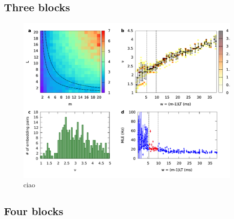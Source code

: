 \documentclass[a4paper,11pt,aps,secnumarabic,balancelastpage,amsmath,amssymb,floatfix,table]{article}
\begin{document}
\subsection{Three blocks}

\begin{figure}[H]
    \centering
    \includegraphics[width=\linewidth]{../3_blocks/4e4_points/plots/chaos.pdf}
    \caption{ciao}
    \label{fig:3 blocks chaos}
\end{figure}

\subsection{Four blocks}
\end{document}

